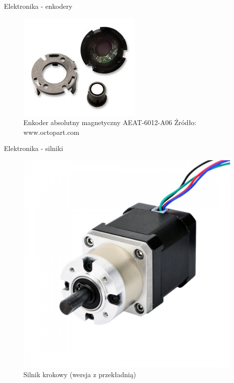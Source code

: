 \documentclass{beamer}
\begin{document}
\begin{frame}{Elektronika - enkodery}
	\begin{figure}[h]
		\centering
		\includegraphics[height=0.6\textheight]{img/encoder_aeat6012_a06.jpg}
		\caption{Enkoder absolutny magnetyczny AEAT-6012-A06 Źródło: www.octopart.com}
		\label{ros:enkoder}
	\end{figure}
\end{frame}	

\begin{frame}{Elektronika - silniki}
	
	\begin{figure}[h]
		\centering
		\includegraphics[height=0.6\textheight]{img/stepper_motor_gear.jpg}
		\caption{Silnik krokowy (wersja z przekładnią)}
		\label{ros:krokowiec}
	\end{figure}
\end{frame}
\end{document}
